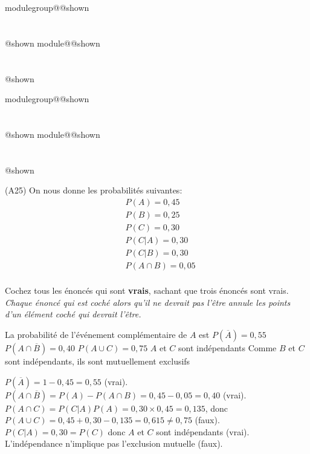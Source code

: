 \documentclass{Evaluation}
\makeatletter
\newcommand{\currentmodulekey}{}
\newcommand{\currentmoduletitle}{}
\newcommand{\currentgroupkey}{}
\newcommand{\currentgrouptitle}{}
\newcommand{\showmoduleifneeded}{%
  \ifx\currentgroupkey\empty\else
    \expandafter\ifx\csname modulegroup@\currentgroupkey @shown\endcsname\relax
      \section*{\currentgrouptitle}%
      \expandafter\gdef\csname modulegroup@\currentgroupkey @shown\endcsname{1}%
    \fi
  \fi
  \expandafter\ifx\csname module@\currentmodulekey @shown\endcsname\relax
    \section*{\currentmoduletitle}%
    \expandafter\gdef\csname module@\currentmodulekey @shown\endcsname{1}%
  \fi
}
\newenvironment{A24}{\showmoduleifneeded}{}
\newenvironment{A25}{\showmoduleifneeded}{}
\makeatother
\begin{document}
\begin{questions}
\begin{A24}
\end{A24}

\begin{A25}
\question (A25)  
On nous donne les probabilités suivantes:
\[
\begin{aligned}
    & P(A) = 0,45 \\
    & P(B) = 0,25 \\
    & P(C) = 0,30 \\
    & P(C|A) = 0,30 \\
    & P(C|B) = 0,30 \\
    & P(A \cap B) = 0,05 \\
\end{aligned}
\]

Cochez tous les énoncés qui sont \textbf{vrais}, sachant que trois énoncés sont vrais. \textit{Chaque énoncé qui est coché alors qu'il ne devrait pas l'être annule les points d'un élément coché qui devrait l'être.}
\begin{checkboxes}
\correctchoice La probabilité de l'événement complémentaire de \(A\) est $ P(\overline{A}) = 0,55 $
\correctchoice $ P(A \cap \overline{B}) = 0,40 $
\choice $ P(A \cup C) = 0,75 $
\correctchoice $A$ et $C$ sont indépendants
\choice Comme $B$ et $C$ sont indépendants, ils sont mutuellement exclusifs
\end{checkboxes}

\begin{solution}
    $P(\overline{A})=1-0,45=0,55$ (vrai). $P(A\cap\overline{B})=P(A)-P(A\cap B)=0,45-0,05=0,40$ (vrai). $P(A\cap C)=P(C|A)P(A)=0,30\times 0,45=0,135$, donc $P(A\cup C)=0,45+0,30-0,135=0,615\neq 0,75$ (faux). $P(C|A)=0,30=P(C)$ donc $A$ et $C$ sont indépendants (vrai). L'indépendance n'implique pas l'exclusion mutuelle (faux).
\end{solution}
\end{A25}


\end{questions}
\end{document}
